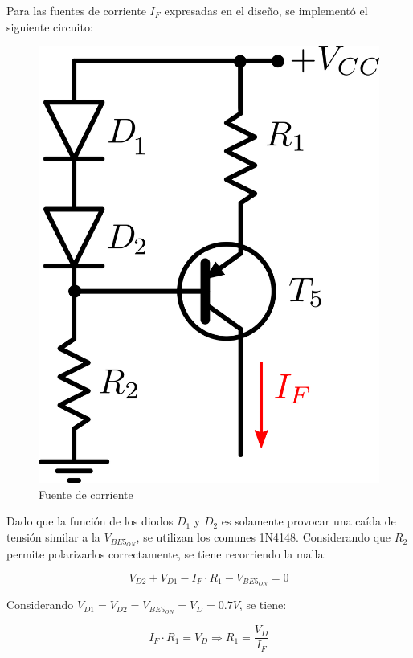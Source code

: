 Para las fuentes de corriente $I_F$ expresadas en el diseño, se implementó el siguiente circuito:

\begin{figure}[!ht]
\begin{centering}
\includegraphics[scale=0.5]{Imagenes/FuenteIF.png}
\par\end{centering}
\caption{Fuente de corriente}
\end{figure}

Dado que la función de los diodos $D_1$ y $D_2$ es solamente provocar una caída de tensión similar a la $V_{BE5_{ON}}$, se utilizan los comunes 1N4148. Considerando que $R_2$ permite polarizarlos correctamente, se tiene recorriendo la malla:

\[
V_{D2} + V_{D1} - I_F \cdot R_1 - V_{BE5_{ON}} = 0
\]

Considerando $V_{D1} = V_{D2} = V_{BE5_{ON}} = V_D = 0.7V$, se tiene:

\[
I_F \cdot R_1 = V_D \Longrightarrow R_1 = \frac{V_D}{I_F}
\]

